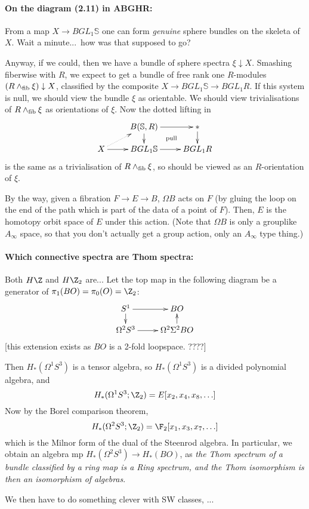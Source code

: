 \documentclass[11pt]{article}
\begin{document}
\paragraph*{On the diagram (2.11) in ABGHR:}
From a map $X\to BGL_1\mathbb{S}$ one can form \emph{genuine} sphere bundles on the skeleta of $X$. Wait a minute...\ how was that supposed to go?

Anyway, if we could, then we have a bundle of sphere spectra $\xi\downarrow X$. Smashing fiberwise with $R$, we expect to get a bundle of free rank one $R$-modules $(R\wedge _\textup{fib}\xi)\downarrow X$, classified by the composite $X\to BGL_1\mathbb{S}\to BGL_{1}R$. If this system is null, we should view the bundle $\xi$ as orientable. We should view trivialisations of $R\wedge _\textup{fib}\xi$ as orientations of $\xi$.
Now the dotted lifting in
\[\xymatrix@R=4mm{
&%
B(\mathbb{S},R)
\ar[d]
\ar[r]
&%
\ast\ar[d]
\\%
X
\ar@{..>}[ur]
\ar[r]
&%
BGL_1\mathbb{S}
\ar[r]
&%
\ar@{}[ul]|-{\textup{pull}}
BGL_1R%
}\]
is the same as a trivialisation of $R\wedge_{\textup{fib}}\xi$, so should be viewed as an $R$-orientation of $\xi$.

By the way, given a fibration $F\to E\to B$, $\Omega B$ acts on $F$ (by gluing the loop on the end of the path which is part of the data of a point of $F$). Then, $E$ is the homotopy orbit space of $E$ under this action. (Note that $\Omega B$ is only a grouplike $A_\infty$ space, so that you don't actually get a group action, only an $A_\infty$ type thing.)

\paragraph*{Which connective spectra are Thom spectra:}
Both $H\Z$ and $H\Z_2$ are... Let the top map in the following diagram be a generator of $\pi_1(BO)=\pi_0(O)=\Z_2$:
\[\xymatrix@R=4mm{
S^1\ar[r]
\ar[d]
&%
BO\\%
\Omega^2S^3\ar[r]
&%
\ar[u]
\Omega^2\Sigma^2BO%
}\]
[this extension exists as $BO$ is a 2-fold loopspace. ????]

Then $H_*(\Omega^1 S^3)$ is a tensor algebra, so $H_*(\Omega^1 S^3)$ is a divided polynomial algebra, and 
\[H_*(\Omega^1 S^3;\Z_2)=E[x_2,x_4,x_8,\ldots]\]
Now by the Borel comparison theorem,
\[H_*(\Omega^2 S^3;\Z_2)=\F_2[x_1,x_3,x_7,\ldots]\]
which is the Milnor form of the dual of the Steenrod algebra. In particular, we obtain an algebra mp $H_*(\Omega^2 S^3)\to H_*(BO)$, as \emph{the Thom spectrum of a bundle classified by a ring map is a Ring spectrum, and the Thom isomorphism is then an isomorphism of algebras}.

We then have to do something clever with SW classes, ...
\end{document}
